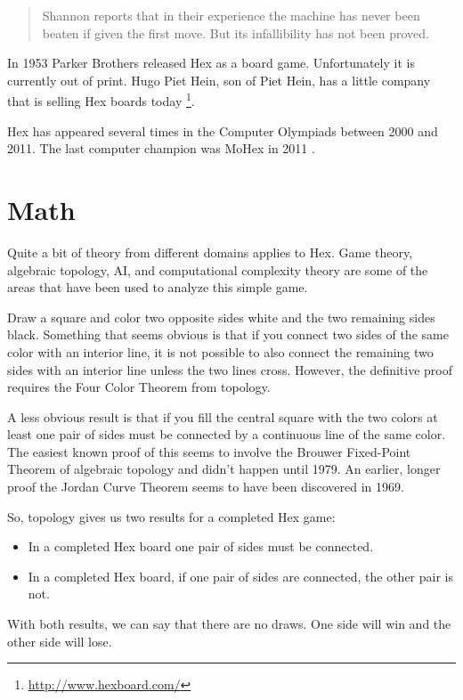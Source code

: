 \documentclass[12pt,titlepage]{amsart}
\begin{document}
\begin{quote}
Shannon reports that in their experience the machine has never been
beaten if given the first move. But its infallibility has not been
proved.
\end{quote}  


In 1953 Parker Brothers released Hex as a board game. Unfortunately it
is currently out of print. Hugo Piet Hein, son of Piet Hein, has a
little company that is selling Hex boards
today \footnote{\url{http://www.hexboard.com/}}.

Hex has appeared several times in the Computer Olympiads between 2000
and 2011.  The last computer champion was MoHex in 2011
\cite{Henderson:2010}.

\section{Math}

Quite a bit of theory from different domains applies to Hex. Game theory,
algebraic topology, AI, and computational complexity theory are some of the
areas that have been used to analyze this simple game.

Draw a square and color two opposite sides white and the two remaining sides
black. Something that seems obvious is that if you connect two sides of the same
color with an interior line, it is not possible to also connect the remaining
two sides with an interior line unless the two lines cross.  However, the
definitive proof requires the Four Color Theorem from topology.

A less obvious result is that if you fill the central square with the two colors
at least one pair of sides must be connected by a continuous line of the same
color. The easiest known proof of this seems to involve the Brouwer Fixed-Point
Theorem of algebraic topology \cite{Gale:1980} and didn't happen until 1979. An
earlier, longer proof the Jordan Curve Theorem seems to have been discovered in
1969.

So, topology gives us two results for a completed Hex game:
\begin{itemize}
\item In a completed Hex board one pair of sides must be connected.

\item In a completed Hex board, if one pair of sides are connected, the other
pair is not.
\end{itemize}

With both results, we can say that there are no draws. One side will win and the
other side will lose.
\end{document}
